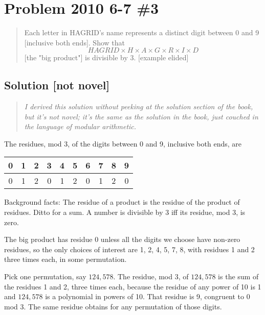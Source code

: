 \documentclass{article}
\begin{document}
\section{Problem 2010 6-7 \#3}

\begin{framed}
\begin{quote}
    Each letter in HAGRID's name represents a  distinct digit between 0 and 9 [inclusive both ends]. Show that 
    \begin{equation}
        HAGRID\times{}H\times{}A\times{}G\times{}R\times{}I\times{}D
    \end{equation}
    [the "big product"] is divisible by 3. [example elided]
\end{quote}
\end{framed}

\subsection{Solution [not novel]}

\begin{quote}
\emph{I derived this solution without peeking at the solution section of the book, but it's not novel; it's the same as the solution in the book, just couched in the language of modular arithmetic.}
\end{quote}

The residues, mod 3, of the digits between 0 and 9, inclusive both ends, are

\begin{tabular}{cccccccccc}
     0 & 1 & 2 & 3 & 4 & 5 & 6 & 7 & 8 & 9  \\ \hline
     0 & 1 & 2 & 0 & 1 & 2 & 0 & 1 & 2 & 0
\end{tabular} 

Background facts: The residue of a product is the residue of the product of residues. Ditto for a sum. A number is divisible by 3 iff its residue, mod 3, is zero.

The big product has residue 0 unless all the digits we choose have non-zero residues, so the only choices of interest are 1, 2, 4, 5, 7, 8, with residues 1 and 2 three times each, in some permutation. 

Pick one permutation, say $124,578$. The residue, mod 3, of $124,578$ is the sum of the residues 1 and 2, three times each, because the residue of any power of 10 is 1 and $124,578$ is a polynomial in powers of 10. That residue is 9, congruent to 0 mod 3. The same residue obtains for any permutation of those digits.
\end{document}
